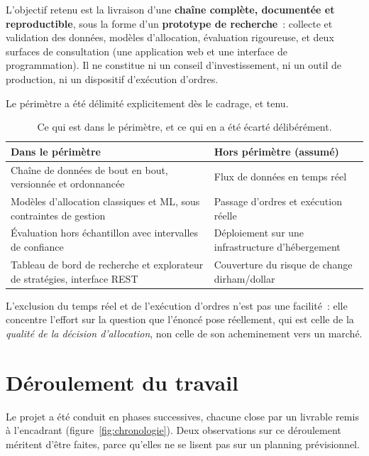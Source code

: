 L'objectif retenu est la livraison d'une \textbf{chaîne complète, documentée et
reproductible}, sous la forme d'un \textbf{prototype de recherche}~: collecte et
validation des données, modèles d'allocation, évaluation rigoureuse, et deux
surfaces de consultation (une application web et une interface de programmation).
Il ne constitue ni un conseil d'investissement, ni un outil de production, ni un
dispositif d'exécution d'ordres.

Le périmètre a été délimité explicitement dès le cadrage, et tenu.

\begin{table}[htbp]
  \centering
  \small
  \caption[Périmètre du projet]{Ce qui est dans le périmètre, et ce qui en a été
  écarté délibérément.}
  \label{tab:perimetre}
  \begin{tabular}{@{}p{6.3cm}p{6.7cm}@{}}
    \toprule
    \textbf{Dans le périmètre} & \textbf{Hors périmètre (assumé)} \\
    \midrule
    Chaîne de données de bout en bout, versionnée et ordonnancée &
    Flux de données en temps réel \\
    Modèles d'allocation classiques et ML, sous contraintes de gestion &
    Passage d'ordres et exécution réelle \\
    Évaluation hors échantillon avec intervalles de confiance &
    Déploiement sur une infrastructure d'hébergement \\
    Tableau de bord de recherche et explorateur de stratégies, interface REST &
    Couverture du risque de change dirham/dollar \\
    \bottomrule
  \end{tabular}
\end{table}

L'exclusion du temps réel et de l'exécution d'ordres n'est pas une facilité~:
elle concentre l'effort sur la question que l'énoncé pose réellement, qui est
celle de la \emph{qualité de la décision d'allocation}, non celle de son
acheminement vers un marché.

\section{Déroulement du travail}

Le projet a été conduit en phases successives, chacune close par un livrable
remis à l'encadrant (figure~\ref{fig:chronologie}). Deux observations sur ce
déroulement méritent d'être faites, parce qu'elles ne se lisent pas sur un
planning prévisionnel.

